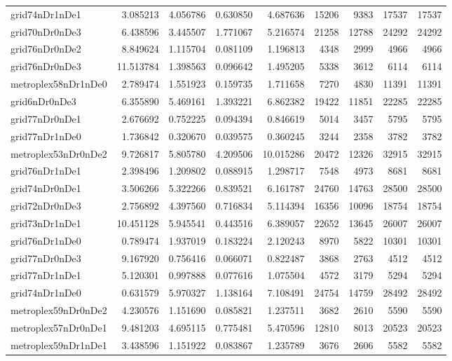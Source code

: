 \begin{longtable}{|l|r|r|r|r|r|r|r|r|}
grid74nDr1nDe1 & 3.085213 & 4.056786 & 0.630850 & 4.687636 & 15206 & 9383 & 17537 & 17537 \\
grid70nDr0nDe3 & 6.438596 & 3.445507 & 1.771067 & 5.216574 & 21258 & 12788 & 24292 & 24292 \\
grid76nDr0nDe2 & 8.849624 & 1.115704 & 0.081109 & 1.196813 & 4348 & 2999 & 4966 & 4966 \\
grid76nDr0nDe3 & 11.513784 & 1.398563 & 0.096642 & 1.495205 & 5338 & 3612 & 6114 & 6114 \\
metroplex58nDr1nDe0 & 2.789474 & 1.551923 & 0.159735 & 1.711658 & 7270 & 4830 & 11391 & 11391 \\
grid6nDr0nDe3 & 6.355890 & 5.469161 & 1.393221 & 6.862382 & 19422 & 11851 & 22285 & 22285 \\
grid77nDr0nDe1 & 2.676692 & 0.752225 & 0.094394 & 0.846619 & 5014 & 3457 & 5795 & 5795 \\
grid77nDr1nDe0 & 1.736842 & 0.320670 & 0.039575 & 0.360245 & 3244 & 2358 & 3782 & 3782 \\
metroplex53nDr0nDe2 & 9.726817 & 5.805780 & 4.209506 & 10.015286 & 20472 & 12326 & 32915 & 32915 \\
grid76nDr1nDe1 & 2.398496 & 1.209802 & 0.088915 & 1.298717 & 7548 & 4973 & 8681 & 8681 \\
grid74nDr0nDe1 & 3.506266 & 5.322266 & 0.839521 & 6.161787 & 24760 & 14763 & 28500 & 28500 \\
grid72nDr0nDe3 & 2.756892 & 4.397560 & 0.716834 & 5.114394 & 16356 & 10096 & 18754 & 18754 \\
grid73nDr1nDe1 & 10.451128 & 5.945541 & 0.443516 & 6.389057 & 22652 & 13645 & 26007 & 26007 \\
grid76nDr1nDe0 & 0.789474 & 1.937019 & 0.183224 & 2.120243 & 8970 & 5822 & 10301 & 10301 \\
grid77nDr0nDe3 & 9.167920 & 0.756416 & 0.066071 & 0.822487 & 3868 & 2763 & 4512 & 4512 \\
grid77nDr1nDe1 & 5.120301 & 0.997888 & 0.077616 & 1.075504 & 4572 & 3179 & 5294 & 5294 \\
grid74nDr1nDe0 & 0.631579 & 5.970327 & 1.138164 & 7.108491 & 24754 & 14759 & 28492 & 28492 \\
metroplex59nDr0nDe2 & 4.230576 & 1.151690 & 0.085821 & 1.237511 & 3682 & 2610 & 5590 & 5590 \\
metroplex57nDr0nDe1 & 9.481203 & 4.695115 & 0.775481 & 5.470596 & 12810 & 8013 & 20523 & 20523 \\
metroplex59nDr1nDe1 & 3.438596 & 1.151922 & 0.083867 & 1.235789 & 3676 & 2606 & 5582 & 5582 \\

\end{longtable}
